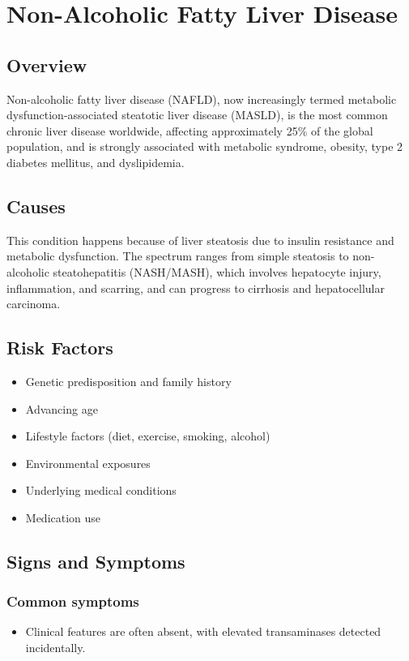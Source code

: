 \chapter{Non-Alcoholic Fatty Liver Disease}
\label{sec:Non-Alcoholic Fatty Liver Disease}

\section{Overview}
Non-alcoholic fatty liver disease (NAFLD), now increasingly termed metabolic dysfunction-associated steatotic liver disease (MASLD), is the most common chronic liver disease worldwide, affecting approximately 25\% of the global population, and is strongly associated with metabolic syndrome, obesity, type 2 diabetes mellitus, and dyslipidemia.
\section{Causes}
This condition happens because of liver steatosis due to insulin resistance and metabolic dysfunction. The spectrum ranges from simple steatosis to non-alcoholic steatohepatitis (NASH/MASH), which involves hepatocyte injury, inflammation, and scarring, and can progress to cirrhosis and hepatocellular carcinoma.     
\section{Risk Factors}

\begin{itemize}[noitemsep]
  \item Genetic predisposition and family history
  \item Advancing age
  \item Lifestyle factors (diet, exercise, smoking, alcohol)
  \item Environmental exposures
  \item Underlying medical conditions
  \item Medication use
\end{itemize}
\section{Signs and Symptoms}

\subsection{Common symptoms}
\begin{itemize}[noitemsep]
  \item Clinical features are often absent, with elevated transaminases detected incidentally. 
  \end{itemize}

